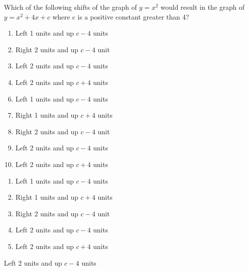 




 Which of the following shifts of the graph of $y = x^{2}$ would result in the graph of $y = x^{2}+4x+c$ where c is a positive constant greater than 4?


\ifsat
	\begin{enumerate}[label=\Alph*)]
		\item   Left 1 units and up $c-4$ units
		\item  Right 2 units and up $c-4$ unit
		\item   Left 2 units and up $c-4$ units%
		\item  Left 2 units and up $c+4$ units
	\end{enumerate}
\else
\fi

\ifacteven
	\begin{enumerate}[label=\textbf{\Alph*.},itemsep=\fill,align=left]
		\setcounter{enumii}{5}
		\item   Left 1 units and up $c-4$ units
		\item   Right 1 units and up $c+4$ units
		\item  Right 2 units and up $c-4$ unit
		\addtocounter{enumii}{1}
		\item   Left 2 units and up $c-4$ units%
		\item  Left 2 units and up $c+4$ units
	\end{enumerate}
\else
\fi

\ifactodd
	\begin{enumerate}[label=\textbf{\Alph*.},itemsep=\fill,align=left]
		\item   Left 1 units and up $c-4$ units
		\item   Right 1 units and up $c+4$ units
		\item  Right 2 units and up $c-4$ unit
		\item   Left 2 units and up $c-4$ units%
		\item  Left 2 units and up $c+4$ units
	\end{enumerate}
\else
\fi

\ifgridin
   Left 2 units and up $c-4$ units%
		
\else
\fi

